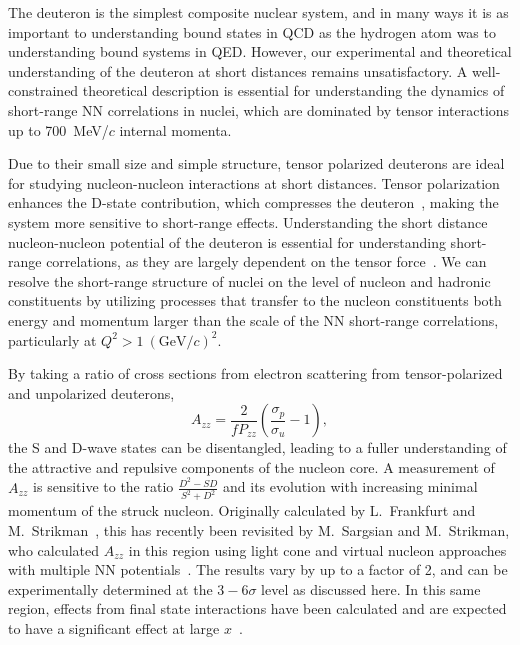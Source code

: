 
The deuteron is the simplest composite nuclear system, and in many ways it is as important to understanding bound states in QCD as the hydrogen atom was to understanding bound systems in QED.  However, our experimental and theoretical understanding of the deuteron at short distances remains unsatisfactory. A well-constrained theoretical description is essential for understanding the dynamics of short-range NN correlations in nuclei, which are dominated by tensor interactions up to 700~MeV/$c$ internal momenta.


Due to their small size and simple structure, tensor polarized deuterons are ideal for studying nucleon-nucleon interactions at short distances. Tensor polarization enhances the D-state contribution, which compresses the deuteron~\cite{Forest:1996kp}, 
making the system more sensitive to short-range effects. Understanding the short distance nucleon-nucleon potential of the deuteron is essential for understanding short-range correlations, as they are largely dependent on the tensor force~\cite{Arrington:2011xs}. We can resolve the short-range structure of nuclei on the level of nucleon and hadronic constituents by utilizing processes that transfer to the nucleon constituents both energy and momentum larger than the scale of the NN short-range correlations, particularly at $Q^2>1~(\mathrm{GeV}/c)^2$.


By taking a ratio of cross sections from electron scattering from tensor-polarized and unpolarized deuterons, 
\begin{equation}
A_{zz}=\frac{2}{fP_{zz}}\left(\frac{\sigma_p}{\sigma_u}-1\right),
\end{equation}
the S and D-wave states can be disentangled, leading to a fuller understanding of the attractive and repulsive components of the nucleon core. A measurement of $A_{zz}$ is sensitive to the ratio $\frac{D^2-SD}{S^2+D^2}$ and its evolution with increasing minimal momentum of the struck nucleon. Originally calculated by L.~Frankfurt and M.~Strikman~\cite{Frankfurt:1988nt}, this has recently been revisited by M.~Sargsian and M.~Strikman, who calculated $A_{zz}$ in this region using light cone and virtual nucleon approaches with multiple NN potentials~\cite{Sargsian:2014fla}. The results vary by up to a factor of 2, and can be experimentally determined at the $3-6\sigma$ level as discussed here. In this same region, effects from final state interactions have been calculated and are expected to have a significant effect at large $x$~\cite{cosyn-convo}.


